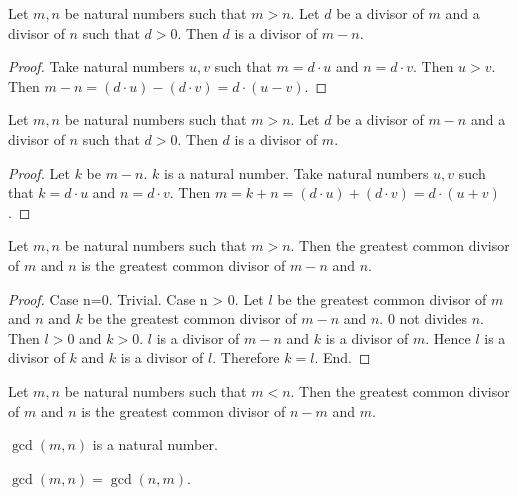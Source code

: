 \documentclass{article}
\begin{document}
\begin{forthel}

\begin{proposition}
Let $m,n$ be natural numbers such that $m > n$.
Let $d$ be a divisor of $m$ and a divisor of $n$ such that $d > 0$.
Then $d$ is a divisor of $m-n$.
\end{proposition}
\begin{proof}
Take natural numbers $u,v$ such that $m = d \cdot u$ and $n = d \cdot v$.
Then $u > v$.
Then $m - n =
(d \cdot u) - (d \cdot v) =
d \cdot (u - v)$.
\end{proof}

\begin{proposition}
Let $m,n$ be natural numbers such that $m > n$.
Let $d$ be a divisor of $m-n$ and a divisor of $n$ such that $d > 0$.
Then $d$ is a divisor of $m$.
\end{proposition}
\begin{proof}
Let $k$ be $m-n$. $k$ is a natural number.
Take natural numbers $u,v$ such that $k = d \cdot u$ and $n = d \cdot v$.
Then $m = k + n =
(d \cdot u) + (d \cdot v) = 
d \cdot (u + v)$.
\end{proof}

\begin{lemma}
Let $m,n$ be natural numbers such that $m > n$. Then
the greatest common divisor of $m$ and $n$ 
is the greatest common divisor of $m-n$ and $n$.
\end{lemma}
\begin{proof}
Case n=0. Trivial.
Case n > 0.
Let $l$ be the greatest common divisor of $m$ and $n$ 
and $k$ be the greatest common divisor of $m-n$ and $n$.
$0$ not divides $n$. Then $l > 0$ and $k > 0$. 
$l$ is a divisor of $m-n$ and $k$ is a divisor of $m$.
Hence $l$ is a divisor of $k$ and $k$ is a divisor of $l$. Therefore $k=l$. End.
\end{proof}


\begin{proposition}
Let $m,n$ be natural numbers such that $m < n$. Then
the greatest common divisor of $m$ and $n$ 
is the greatest common divisor of $n-m$ and $m$.
\end{proposition}



\begin{signature}
$\gcd(m,n)$ is a natural number.
\end{signature}

\begin{axiom}
$\gcd(m,n) = \gcd(n,m)$.
\end{axiom}


\end{forthel}
\end{document}
